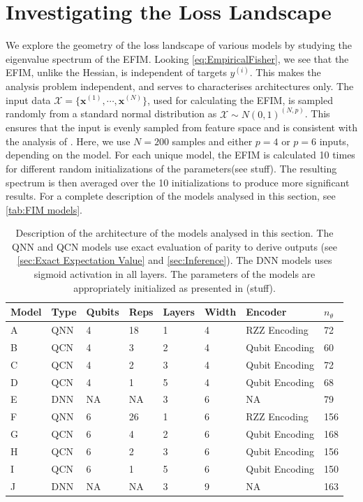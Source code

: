 \section{Investigating the Loss Landscape}\label{sec:Investigating the Loss Landscape}
We explore the geometry of the loss landscape of various models by studying the eigenvalue spectrum of the EFIM. Looking \autoref{eq:EmpiricalFisher}, we see that the EFIM, unlike the Hessian, is independent of targets $y^{(i)}$. This makes the analysis problem independent, and serves to characterises architectures only. The input data $\mathcal{X} = \{\boldsymbol{x}^{(1)}, \cdots, \boldsymbol{x}^{(N)}\}$, used for calculating the EFIM, is sampled randomly from a standard normal distribution as $\mathcal{X} \sim N(0,1)^{(N,p)}$. This ensures that the input is evenly sampled from feature space and is consistent with the analysis of \citet{abbas2020power}.  Here, we use $N=200$ samples and either $p=4$ or $p=6$ inputs, depending on the model. For each unique model, the EFIM is calculated 10 times for different random initializations of the parameters(see stuff). The resulting spectrum is then averaged over the 10 initializations to produce more significant results. For a complete description of the models analysed in this section, see \autoref{tab:FIM models}.

\begin{table}[H]
\centering
\begin{tabular}{|l|l|l|l|l|l|l|l|}
\hline
Model &Type & Qubits& Reps & Layers & Width & Encoder        & $n_{\theta}$ \\ \hline
A    & QNN & 4& 18   & 1      & 4     & RZZ Encoding   & 72  \\ \hline
B    & QCN & 4& 3    & 2      & 4     & Qubit Encoding & 60 \\ \hline
C    & QCN & 4& 2    & 3      & 4     & Qubit Encoding & 72  \\ \hline
D    & QCN & 4& 1    & 5      & 4     & Qubit Encoding & 68  \\ \hline
E    & DNN & NA& NA   & 3      & 6     & NA             & 79 \\ \hline
F    & QNN & 6& 26   & 1      & 6     & RZZ Encoding   & 156  \\ \hline
G    & QCN & 6& 4    & 2      & 6     & Qubit Encoding & 168 \\ \hline
H    & QCN & 6& 2    & 3      & 6     & Qubit Encoding & 156  \\ \hline
I    & QCN & 6& 1    & 5      & 6     & Qubit Encoding & 150  \\ \hline
J    & DNN & NA& NA   & 3      & 9     & NA             & 163 \\ \hline
\end{tabular}
\caption{Description of the architecture of the models analysed in this section. The QNN and QCN models use exact evaluation of parity to derive outputs (see \autoref{sec:Exact Expectation Value} and \autoref{sec:Inference}). The DNN models uses sigmoid activation in all layers. The parameters of the models are appropriately initialized as presented in (stuff).} 
\label{tab:FIM models}
\end{table}

